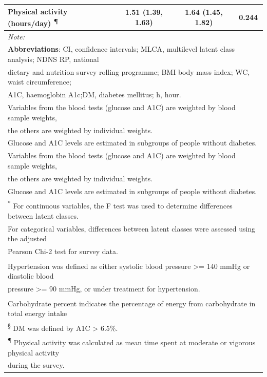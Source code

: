 \begin{table}[h]
\begin{tabular}[t]{lccc}
			Physical
			activity (hours/day) \textsuperscript{\P} & 1.51 (1.39, 1.63) & 1.64 (1.45, 1.82) & 0.244\\
			\bottomrule
			\multicolumn{4}{l}{\textit{Note: }}\\
			\multicolumn{4}{l}{\textbf{Abbreviations}: CI, confidence intervals; MLCA, multilevel latent class analysis; NDNS RP, national}\\ 
			\multicolumn{4}{l}{dietary and nutrition survey rolling programme; BMI body mass index; WC, waist circumference; }\\
			\multicolumn{4}{l}{A1C, haemoglobin A1c;DM, diabetes mellitus; h, hour.}\\
			\multicolumn{4}{l}{Variables from the blood tests (glucose and A1C) are weighted by blood sample weights,}\\
			\multicolumn{4}{l}{the others are weighted by individual weights.}\\
			\multicolumn{4}{l}{Glucose and A1C levels are estimated in subgroups of people without diabetes.}\\
			\multicolumn{4}{l}{Variables from the blood tests (glucose and A1C) are weighted by blood sample weights,}\\  
			\multicolumn{4}{l}{the others are weighted by individual weights.}\\
			\multicolumn{4}{l}{Glucose and A1C levels are estimated in subgroups of people without diabetes.}\\
			\multicolumn{4}{l}{\textsuperscript{*} For continuous variables, the F test was used to determine differences between latent classes.}\\
			\multicolumn{4}{l}{For categorical variables, differences between latent classes were assessed using the adjusted}\\
			\multicolumn{4}{l}{Pearson Chi-2 test for survey data.}\\
			\multicolumn{4}{l}{\textsuperscript{\dag} Hypertension was defined as either systolic blood pressure >= 140 mmHg or diastolic blood}\\
			\multicolumn{4}{l}{pressure >= 90 mmHg, or under treatment for hypertension.}\\
			\multicolumn{4}{l}{\textsuperscript{\ddag} Carbohydrate percent indicates the percentage of energy from carbohydrate in total energy intake}\\
			\multicolumn{4}{l}{\textsuperscript{\S} DM was defined by A1C > 6.5\%.}\\
			\multicolumn{4}{l}{\textsuperscript{\P} Physical activity was calculated as mean time spent at moderate or vigorous physical activity}\\
			\multicolumn{4}{l}{during the survey.}\\
		\end{tabular}
	\end{table}











